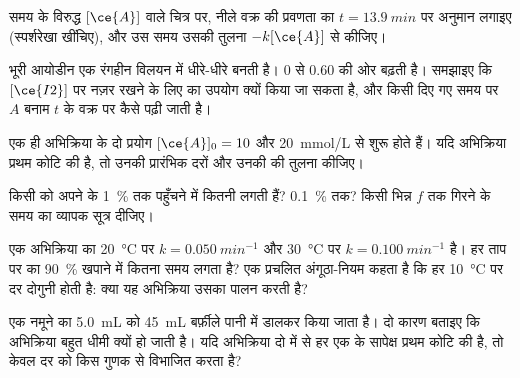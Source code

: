 \begin{exercise}[$\star\star$]\label{exo:g12:reaction-rates:9}
समय के विरुद्ध $[\ce{A}]$ वाले चित्र पर, नीले
वक्र की प्रवणता का $t = \qty{13.9}{min}$ पर अनुमान लगाइए (स्पर्शरेखा खींचिए), और उस समय
उसकी तुलना $-k[\ce{A}]$ से कीजिए।
\end{exercise}

\begin{exercise}[$\star\star$]\label{exo:g12:reaction-rates:10}
भूरी आयोडीन  एक रंगहीन विलयन में धीरे-धीरे बनती है।
 0 से 0.60 की ओर बढ़ती है। समझाइए कि $[\ce{I2}]$ पर नज़र रखने के लिए
 का उपयोग क्यों किया जा सकता है, और किसी दिए गए समय पर 
$A$ बनाम $t$ के वक्र पर कैसे पढ़ी जाती है।
\end{exercise}

\begin{exercise}[$\star\star$]\label{exo:g12:reaction-rates:11}
एक ही अभिक्रिया के दो प्रयोग $[\ce{A}]_0 = 10$ और
\qty{20}{mmol/L} से शुरू होते हैं। यदि अभिक्रिया प्रथम कोटि की है, तो उनकी प्रारंभिक
दरों और उनकी  की तुलना कीजिए।
\end{exercise}

\begin{exercise}[$\star\star\star$]\label{exo:g12:reaction-rates:12}
किसी  को अपने  के \qty{1}{\percent} तक पहुँचने में
कितनी  लगती हैं? \qty{0.1}{\percent} तक? किसी भिन्न $f$ तक गिरने के
समय का व्यापक सूत्र दीजिए।
\end{exercise}

\begin{exercise}[$\star\star\star$]\label{exo:g12:reaction-rates:13}
एक अभिक्रिया का \qty{20}{\celsius} पर $k = \qty{0.050}{min^{-1}}$ और
\qty{30}{\celsius} पर $k = \qty{0.100}{min^{-1}}$ है। हर ताप पर  का
\qty{90}{\percent} खपाने में कितना समय लगता है? एक
प्रचलित अंगूठा-नियम कहता है कि हर \qty{10}{\celsius} पर दर दोगुनी होती है: क्या
यह अभिक्रिया उसका पालन करती है?
\end{exercise}

\begin{exercise}[$\star\star\star$]\label{exo:g12:reaction-rates:14}
एक नमूने का  \qty{5.0}{mL} को \qty{45}{mL} बर्फ़ीले
पानी में डालकर किया जाता है। दो कारण बताइए कि अभिक्रिया बहुत धीमी क्यों हो जाती है। यदि
अभिक्रिया दो  में से हर एक के सापेक्ष प्रथम कोटि की है, तो केवल
 दर को किस गुणक से विभाजित करता है?
\end{exercise}


